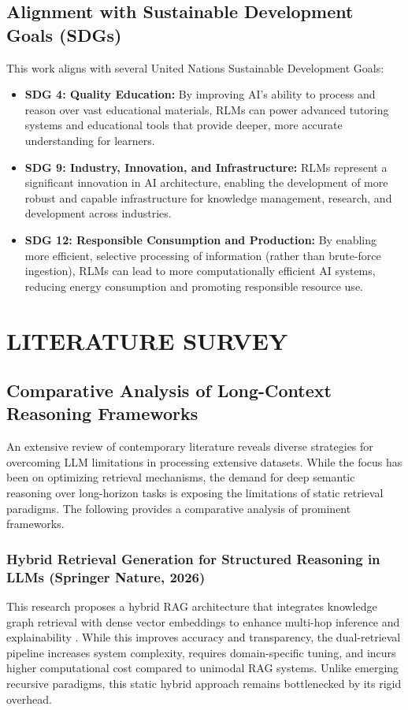 \section{Alignment with Sustainable Development Goals (SDGs)}
This work aligns with several United Nations Sustainable Development Goals:
\begin{itemize}
	\item \textbf{SDG 4: Quality Education:} By improving AI's ability to process and reason over vast educational materials, RLMs can power advanced tutoring systems and educational tools that provide deeper, more accurate understanding for learners.
	\item \textbf{SDG 9: Industry, Innovation, and Infrastructure:} RLMs represent a significant innovation in AI architecture, enabling the development of more robust and capable infrastructure for knowledge management, research, and development across industries.
	\item \textbf{SDG 12: Responsible Consumption and Production:} By enabling more efficient, selective processing of information (rather than brute-force ingestion), RLMs can lead to more computationally efficient AI systems, reducing energy consumption and promoting responsible resource use.
\end{itemize}

\chapter{LITERATURE SURVEY}


\section{Comparative Analysis of Long-Context Reasoning Frameworks}
An extensive review of contemporary literature reveals diverse strategies for overcoming LLM limitations in processing extensive datasets. While the focus has been on optimizing retrieval mechanisms, the demand for deep semantic reasoning over long-horizon tasks is exposing the limitations of static retrieval paradigms. The following provides a comparative analysis of prominent frameworks.

\subsection*{Hybrid Retrieval Generation for Structured Reasoning in LLMs (Springer Nature, 2026)}
This research proposes a hybrid RAG architecture that integrates knowledge graph retrieval with dense vector embeddings to enhance multi-hop inference and explainability \cite{hybrid2026}. While this improves accuracy and transparency, the dual-retrieval pipeline increases system complexity, requires domain-specific tuning, and incurs higher computational cost compared to unimodal RAG systems. Unlike emerging recursive paradigms, this static hybrid approach remains bottlenecked by its rigid overhead.

